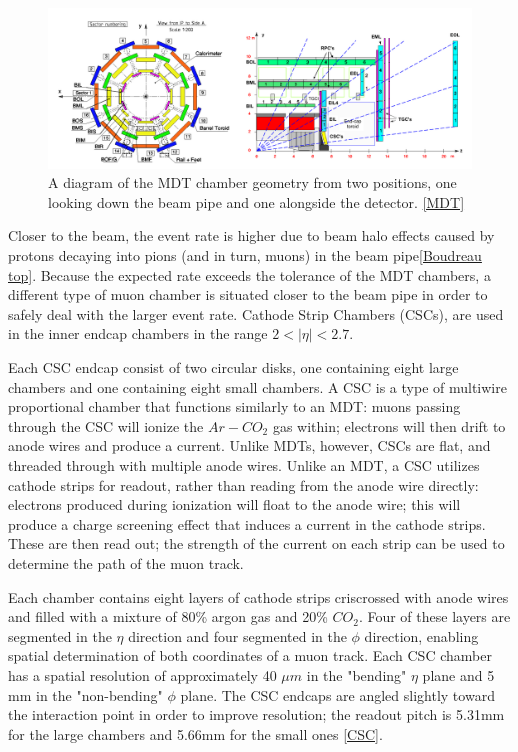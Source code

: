 \begin{figure}[ht!]
  \includegraphics[width=\linewidth]{figures/detector_chapter/MDTChamber.png}
  \caption{A diagram of the MDT chamber geometry from two positions, one looking down the beam pipe and one alongside the detector. \ref{MDT}}
  \label{fig:MDTChamber}
\end{figure}

Closer to the beam, the event rate is higher due to beam halo effects caused by protons decaying into pions (and in turn, muons) in the beam pipe\ref{Boudreau top}. Because the expected rate exceeds the tolerance of the MDT chambers, a different type of muon chamber is situated closer to the beam pipe in order to safely deal with the larger event rate. Cathode Strip Chambers (CSCs), are used in the inner endcap chambers in the range $ 2 < | \eta | < 2.7 $.

Each CSC endcap consist of two circular disks, one containing eight large chambers and one containing eight small chambers. A CSC is a type of multiwire proportional chamber that functions similarly to an MDT: muons passing through the CSC will ionize the $Ar-CO_2$ gas within; electrons will then drift to anode wires and produce a current. Unlike MDTs, however, CSCs are flat, and threaded through with multiple anode wires. Unlike an MDT, a CSC utilizes cathode strips for readout, rather than reading from the anode wire directly: electrons produced during ionization will float to the anode wire; this will produce a charge screening effect that induces a current in the cathode strips. These are then read out; the strength of the current on each strip can be used to determine the path of the muon track.

Each chamber contains eight layers of cathode strips criscrossed with anode wires and filled with a mixture of 80\% argon gas and 20\% $CO_2$. Four of these layers are segmented in the $\eta$ direction and four segmented in the $\phi$ direction, enabling spatial determination of both coordinates of a muon track. Each CSC chamber has a spatial resolution of approximately 40 $\mu m$ in the "bending" $\eta$ plane and 5 mm in the "non-bending" $\phi$ plane. The CSC endcaps are angled slightly toward the interaction point in order to improve resolution; the readout pitch is 5.31mm for the large chambers and 5.66mm for the small ones \ref{CSC}.

